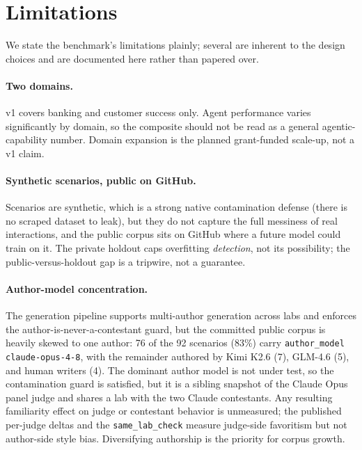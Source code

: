 \section{Limitations}
\label{sec:limitations}

We state the benchmark's limitations plainly; several are inherent to the design
choices and are documented here rather than papered over.

\paragraph{Two domains.} v1 covers banking and customer success only. Agent
performance varies significantly by domain, so the composite should not be read as
a general agentic-capability number. Domain expansion is the planned grant-funded
scale-up, not a v1 claim.

\paragraph{Synthetic scenarios, public on GitHub.} Scenarios are synthetic, which
is a strong native contamination defense (there is no scraped dataset to leak), but
they do not capture the full messiness of real interactions, and the public corpus
sits on GitHub where a future model could train on it. The private holdout caps
overfitting \emph{detection}, not its possibility; the public-versus-holdout gap is
a tripwire, not a guarantee.

\paragraph{Author-model concentration.} The generation pipeline supports
multi-author generation across labs and enforces the author-is-never-a-contestant
guard, but the committed public corpus is heavily skewed to one author: 76 of the
92 scenarios (83\%) carry \texttt{author\_model} \texttt{claude-opus-4-8}, with
the remainder authored by Kimi K2.6 (7), GLM-4.6 (5), and human writers (4). The
dominant author model is not under test, so the contamination guard is satisfied,
but it is a sibling snapshot of the Claude Opus panel judge and shares a lab with
the two Claude contestants. Any resulting familiarity effect on judge or
contestant behavior is unmeasured; the published per-judge deltas and the
\texttt{same\_lab\_check} measure judge-side favoritism but not author-side style
bias. Diversifying authorship is the priority for corpus growth.


